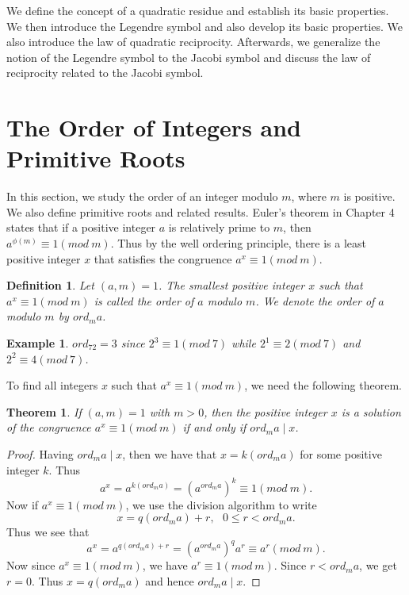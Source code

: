 \documentclass[12pt,letterpaper]{book}
\newtheorem{theorem}{Theorem}
\newtheorem{def1}{Definition}
\newtheorem{example}{Example}
\begin{document}
\par We define the concept of a quadratic residue and establish
its basic properties.  We then introduce the Legendre symbol and also
develop its basic properties.  We also introduce the law of
quadratic reciprocity.  Afterwards, we generalize the notion of
the Legendre symbol to the Jacobi symbol and discuss the law of
reciprocity related to the Jacobi symbol.

\newpage

\section{The Order of Integers and Primitive Roots}
In this section, we study the order of an integer modulo $m$, where
$m$ is positive.  We also define primitive roots and related
results.  Euler's theorem in Chapter 4 states that if a positive
integer $a$ is relatively prime to $m$, then $a^{\phi(m)}\equiv 1
(mod \ m)$.  Thus by the well ordering principle, there is a least
positive integer $x$ that satisfies the congruence $a^{x}\equiv 1
(mod \ m)$. 
\begin{def1}
Let $(a,m)=1$.  The smallest positive integer $x$ such that\\ $a^{x}
\equiv 1(mod \ m)$ is called the order of $a$ modulo $m$.  We denote
the order of $a$ modulo $m$ by $ord_ma$.
\end{def1}

\begin{example}
$ord_72=3$ since $2^3\equiv 1(mod \ 7)$ while $2^1\equiv 2(mod \ 7)$
and\\ $2^2\equiv 4(mod \ 7)$.
\end{example}

To find all integers $x$ such that $a^x\equiv 1(mod \ m)$, we need
the following theorem.

\begin{theorem}\label{ord}
If $(a,m)=1$ with $m>0$, then the positive integer $x$ is a solution
of the congruence $a^x\equiv 1(mod \ m)$ if and only if $ord_ma\mid
x$.
\end{theorem}

\begin{proof}
Having $ord_ma\mid x$, then we have that $x=k(ord_ma)$ for some
positive integer $k$. Thus
\begin{equation*}
a^x=a^{k(ord_ma)}=(a^{ord_ma})^k\equiv 1(mod \ m).
\end{equation*}
Now if $a^x\equiv 1(mod \ m)$, we use the division algorithm to
write
\begin{equation*}
x=q(ord_ma)+r, \ \ \ 0\leq r<ord_ma.
\end{equation*}
Thus we see that
\begin{equation*}
a^x= a^{q(ord_ma)+r}= (a^{ord_ma})^qa^r\equiv a^r (mod \ m).
\end{equation*}
Now since $a^x\equiv 1(mod \ m)$, we have $a^r\equiv 1(mod \ m)$.
Since $r<ord_ma$, we get $r=0$.  Thus $x=q(ord_ma)$ and hence
$ord_ma\mid x$.
\end{proof}
\end{document}
